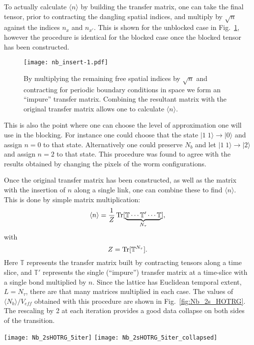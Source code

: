 \documentclass[../main.tex]{subfiles}
\begin{document}
To actually calculate $\langle n \rangle$ by building the transfer matrix, one can take the final tensor, prior to
contracting the dangling spatial indices, and multiply by $\sqrt{n}$ against the indices $n_{x}$ and $n_{x'}$. This is
shown for the unblocked case in Fig.~\ref{fig:nb}, however the procedure is identical for the blocked case once the
blocked tensor has been constructed.
\begin{figure}[htpb]
  \centering
	\texttt{[image: nb\_insert-1.pdf]}
    \caption{By multiplying the remaining free spatial indices by $\sqrt{n}$
    and contracting for periodic boundary conditions in space we form an
    ``impure'' transfer matrix.  Combining the resultant matrix with the
    original transfer matrix allows one to calculate $\langle n \rangle$.}
    \label{fig:nb}
\end{figure}
This is also the point where one can choose the level of approximation one will use in the blocking.  For instance one
could choose that the state $|1 \; 1 \rangle \rightarrow |0\rangle$ and assign $n = 0$ to that state.  Alternatively
one could preserve $N_{b}$ and let $|1 \; 1 \rangle \rightarrow |2 \rangle$ and assign $n = 2$ to that state.  This
procedure was found to agree with the results obtained by changing the pixels of the worm configurations.

Once the original transfer matrix has been constructed, as well as the matrix with the insertion of $n$ along a single
link, one can combine these to find $\langle n \rangle$.  This is done by simple matrix multiplication:
%
\begin{equation}
    \langle n \rangle = \frac{1}{Z} \operatorname{Tr}[\underbrace{\mathbb{T} \cdots
    \mathbb{T}' \cdots \mathbb{T}}_{N_{\tau}}],
\end{equation}
%
with
%
\begin{equation}
	Z = \operatorname{Tr}[\mathbb{T}^{N_{\tau}}].
\end{equation}
%
Here $\mathbb{T}$ represents the transfer matrix built by contracting tensors along a time slice, and $\mathbb{T}'$
represents the single (``impure'') transfer matrix at a time-slice with a single bond multiplied by $n$.  Since the
lattice has Euclidean temporal extent, $L = N_{\tau}$, there are that many matrices multiplied in each case. The values
of $\langle N_b\rangle/V_{eff}$ obtained with this procedure are shown in Fig.~\ref{fig:Nb_2s_HOTRG}.  The rescaling by
2 at each iteration provides a good data collapse on both sides of the transition.

\begin{figure*}[htpb]
    \centering 
    \texttt{[image: Nb\_2sHOTRG\_5iter]}\hfill%
    \texttt{[image: Nb\_2sHOTRG\_5iter\_collapsed]}
    \caption{(a) $\langle N_b\rangle$ vs $(T - 2.46)$ under successive blocking
        steps calculated using 2-state HOTRG. (b) $\langle N_b\rangle$ vs $(T -
        2.46) / L_{eff}$ under successive blocking steps calculated using
        2-state HOTRG. Note that the value of $2.46$ was deteremined
        qualitatively by choosing the value which gave the best resulting data
        collapse.}%
    \label{fig:Nb_2s_HOTRG}
\end{figure*}
%
\end{document}
